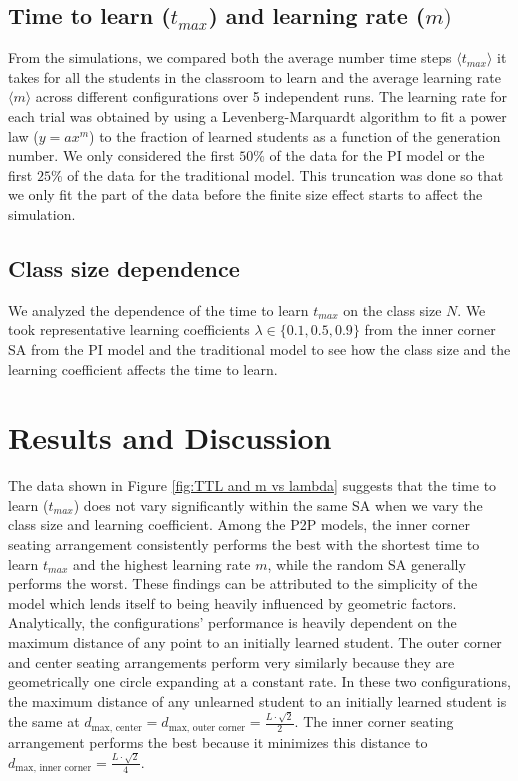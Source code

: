 \documentclass[10pt,a4paper,twoside]{article}
\begin{document}
\subsection{Time to learn ($t_{max}$) and learning rate ($m)$}
From the simulations, we compared both the average number time steps $\langle t_{max} \rangle$ it takes for all the students in the classroom to learn and the average learning rate $\langle m \rangle$ across different configurations over 5 independent runs. The learning rate for each trial was obtained by using a Levenberg-Marquardt algorithm to fit a power law ($y = ax^m$) to the fraction of learned students as a function of the generation number. We only considered the first $50\%$ of the data for the PI model or the first $25\%$ of the data for the traditional model. This truncation was done so that we only fit the part of the data before the finite size effect starts to affect the simulation. %

\subsection{Class size dependence}
We analyzed the dependence of the time to learn $t_{max}$ on the class size $N$. We took representative learning coefficients $\lambda \in \lbrace 0.1, 0.5, 0.9 \rbrace$ from the inner corner SA from the PI model and the traditional model to see how the class size and the learning coefficient affects the time to learn. %

\section{Results and Discussion}
The data shown in Figure \ref{fig:TTL and m vs lambda} suggests that the time to learn ($t_{max}$) does not vary significantly within the same SA when we vary the class size and learning coefficient. Among the P2P models, the inner corner seating arrangement consistently performs the best with the shortest time to learn $t_{max}$ and the highest learning rate $m$, while the random SA generally performs the worst. These findings can be attributed to the simplicity of the model which lends itself to being heavily influenced by geometric factors. Analytically, the configurations’ performance is heavily dependent on the maximum distance of any point to an initially learned student. The outer corner and center seating arrangements perform very similarly because they are geometrically one circle expanding at a constant rate. In these two configurations, the maximum distance of any unlearned student to an initially learned student is the same at $d_{\text{max, center}} = d_{\text{max, outer corner}}=\frac{L\cdot\sqrt{2}}{2}$. The inner corner seating arrangement performs the best because it minimizes this distance to $d_{\text{max, inner corner}}=\frac{L\cdot\sqrt{2}}{4}$.
\end{document}

